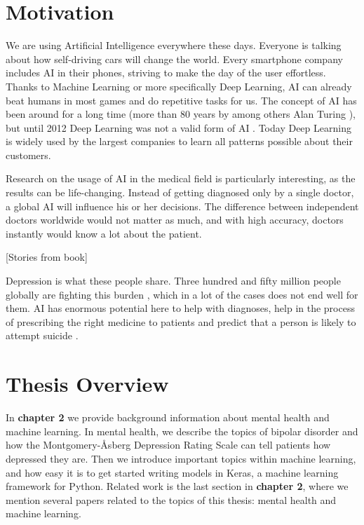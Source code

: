 
\section{Motivation}

We are using Artificial Intelligence everywhere these days. Everyone is talking about how self-driving cars will change the world. Every smartphone company includes AI in their phones, striving to make the day of the user effortless. Thanks to Machine Learning or more specifically Deep Learning, AI can already beat humans in most games and do repetitive tasks for us. The concept of AI has been around for a long time (more than 80 years by among others Alan Turing \cite{turing1938}), but until 2012 Deep Learning was not a valid form of AI \cite{topol2019}. Today Deep Learning is widely used by the largest companies to learn all patterns possible about their customers. 

Research on the usage of AI in the medical field is particularly interesting, as the results can be life-changing. Instead of getting diagnosed only by a single doctor, a global AI will influence his or her decisions. The difference between independent doctors worldwide would not matter as much, and with high accuracy, doctors instantly would know a lot about the patient. 

[Stories from book]

Depression is what these people share. Three hundred and fifty million people globally are fighting this burden \cite{burden_of_depression}, which in a lot of the cases does not end well for them. AI has enormous potential here to help with diagnoses, help in the process of prescribing the right medicine to patients and predict that a person is likely to attempt suicide \cite{topol2019}. 

\section{Thesis Overview}
In \textbf{chapter 2} we provide background information about mental health and machine learning. In mental health, we describe the topics of bipolar disorder and how the Montgomery-Åsberg Depression Rating Scale can tell patients how depressed they are. Then we introduce important topics within machine learning, and how easy it is to get started writing models in Keras, a machine learning framework for Python. Related work is the last section in \textbf{chapter 2}, where we mention several papers related to the topics of this thesis: mental health and machine learning. \\

